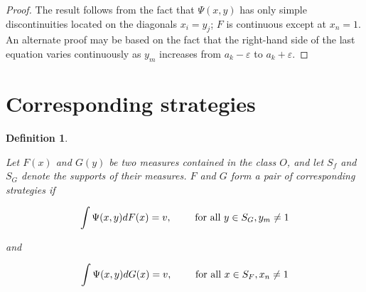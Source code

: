 \documentclass{article}
\newtheorem{definition}{Definition}
\theoremstyle{remark}
\begin{document}
\begin{proof}

The result follows from the fact that $\Psi(x, y)$ has only simple
discontinuities located on the diagonals $x_i = y_j$; $F$ is continuous except
at $x_n = 1$. An alternate proof may be based on the fact that the right-hand
side of the last equation varies continuously as $y_m$ increases from $a_k -
\varepsilon$ to $a_k + \varepsilon$.

\end{proof}

\section{Corresponding strategies}

\begin{definition} \label{defn:corresponding-strategies}

Let $F(x)$ and $G(y)$ be two measures contained in the class $O$, and let $S_f$
and $S_G$ denote the supports of their measures. $F$ and $G$ form a pair of
corresponding strategies if

\[
\int \Psi(x, y) dF(x) = v, \qquad \textup{ for all } y \in S_G, y_m \neq 1
\]

and

\[
\int \Psi(x, y) dG(x) = v, \qquad \textup{ for all } x \in S_F, x_n \neq 1
\]

\end{definition}
\end{document}
